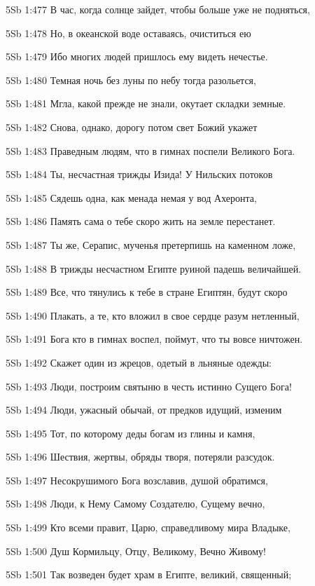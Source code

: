 \vs 5Sb 1:477 В час, когда солнце зайдет, чтобы больше уже не подняться, 

\vs 5Sb 1:478 Но, в океанской воде оставаясь, очиститься ею  

\vs 5Sb 1:479 Ибо многих людей пришлось ему видеть нечестье. 

\vs 5Sb 1:480 Темная ночь без луны по небу тогда разольется,

\vs 5Sb 1:481 Мгла, какой прежде не знали, окутает складки земные. 

\vs 5Sb 1:482 Снова, однако, дорогу потом свет Божий укажет 

\vs 5Sb 1:483 Праведным людям, что в гимнах поспели Великого Бога.

\vs 5Sb 1:484 Ты, несчастная трижды Изида! У Нильских потоков 

\vs 5Sb 1:485 Сядешь одна, как менада немая у вод Ахеронта, 

\vs 5Sb 1:486 Память сама о тебе скоро жить на земле перестанет. 

\vs 5Sb 1:487 Ты же, Серапис, мученья претерпишь на каменном ложе, 

\vs 5Sb 1:488 В трижды несчастном Египте руиной падешь величайшей. 

\vs 5Sb 1:489 Все, что тянулись к тебе в стране Египтян, будут скоро

\vs 5Sb 1:490 Плакать, а те, кто вложил в свое сердце разум нетленный, 

\vs 5Sb 1:491 Бога кто в гимнах воспел, поймут, что ты вовсе ничтожен.

\vs 5Sb 1:492 Скажет один из жрецов, одетый в льняные одежды: 

\vs 5Sb 1:493 Люди, построим святыню в честь истинно Сущего Бога! 

\vs 5Sb 1:494 Люди, ужасный обычай, от предков идущий, изменим 

\vs 5Sb 1:495 Тот, по которому деды богам из глины и камня, 

\vs 5Sb 1:496 Шествия, жертвы, обряды творя, потеряли разсудок. 

\vs 5Sb 1:497 Несокрушимого Бога возславив, душой обратимся, 

\vs 5Sb 1:498 Люди, к Нему Самому  Создателю, Сущему вечно, 

\vs 5Sb 1:499 Кто всеми правит, Царю, справедливому мира Владыке,

\vs 5Sb 1:500 Душ Кормильцу, Отцу, Великому, Вечно Живому! 

\vs 5Sb 1:501 Так возведен будет храм в Египте, великий, священный; 

